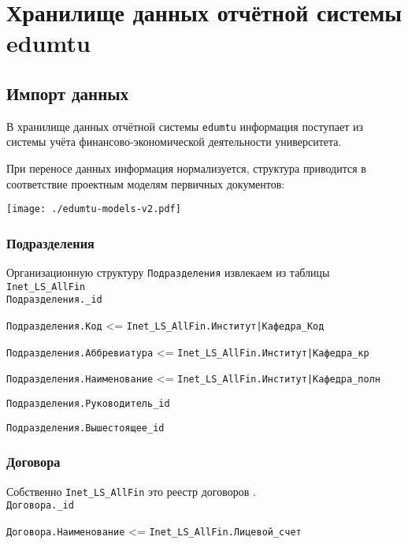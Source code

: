 \documentclass[12pt,a4paper]{scrartcl}
\begin{document}
\linespread{1.3}%
\selectfont %

\section*{Хранилище данных отчётной системы edumtu}

\subsection*{Импорт данных}

В хранилище данных отчётной системы \texttt{edumtu} информация поступает из системы учёта финансово-экономической деятельности университета. 

При переносе данных информация нормализуется, структура приводится в соответствие проектным моделям первичных документов:

\texttt{[image: ./edumtu-models-v2.pdf]}  %


\subsubsection*{Подразделения}

Организационную структуру \texttt{Подразделения} извлекаем из таблицы \texttt{Inet\_LS\_AllFin}\\

\texttt{Подразделения.\_id}

\texttt{Подразделения.Код} <= \texttt{Inet\_LS\_AllFin.Институт|Кафедра\_Код}

\texttt{Подразделения.Аббревиатура} <= \texttt{Inet\_LS\_AllFin.Институт|Кафедра\_кр}

\texttt{Подразделения.Наименование} <= \texttt{Inet\_LS\_AllFin.Институт|Кафедра\_полн}

\texttt{Подразделения.Руководитель\_id}

\texttt{Подразделения.Вышестоящее\_id}


\subsubsection*{Договора}

Собственно \texttt{Inet\_LS\_AllFin} это реестр договоров .\\

\texttt{Договора.\_id}

\texttt{Договора.Наименование} <= \texttt{Inet\_LS\_AllFin.Лицевой\_счет}
\end{document}
